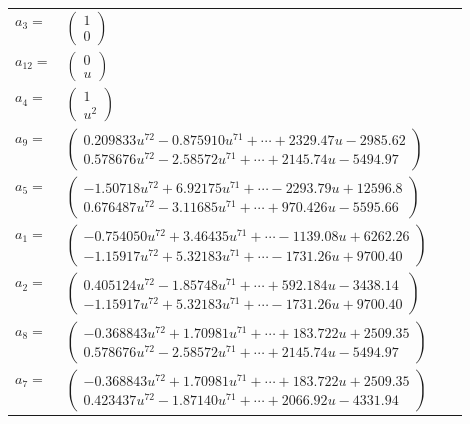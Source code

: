 \documentclass[1p]{elsarticle_modified}
\theoremstyle{definition}
\begin{document}
\begin{tabular}{m{7pt} m{180pt} m{7pt} m{180pt} }
\flushright $a_{3}=$&$\begin{pmatrix}1\\0\end{pmatrix}$ \\
\flushright $a_{12}=$&$\begin{pmatrix}0\\u\end{pmatrix}$ \\
\flushright $a_{4}=$&$\begin{pmatrix}1\\u^2\end{pmatrix}$ \\
\flushright $a_{9}=$&$\begin{pmatrix}0.209833 u^{72}-0.875910 u^{71}+\cdots+2329.47 u-2985.62\\0.578676 u^{72}-2.58572 u^{71}+\cdots+2145.74 u-5494.97\end{pmatrix}$ \\
\flushright $a_{5}=$&$\begin{pmatrix}-1.50718 u^{72}+6.92175 u^{71}+\cdots-2293.79 u+12596.8\\0.676487 u^{72}-3.11685 u^{71}+\cdots+970.426 u-5595.66\end{pmatrix}$ \\
\flushright $a_{1}=$&$\begin{pmatrix}-0.754050 u^{72}+3.46435 u^{71}+\cdots-1139.08 u+6262.26\\-1.15917 u^{72}+5.32183 u^{71}+\cdots-1731.26 u+9700.40\end{pmatrix}$ \\
\flushright $a_{2}=$&$\begin{pmatrix}0.405124 u^{72}-1.85748 u^{71}+\cdots+592.184 u-3438.14\\-1.15917 u^{72}+5.32183 u^{71}+\cdots-1731.26 u+9700.40\end{pmatrix}$ \\
\flushright $a_{8}=$&$\begin{pmatrix}-0.368843 u^{72}+1.70981 u^{71}+\cdots+183.722 u+2509.35\\0.578676 u^{72}-2.58572 u^{71}+\cdots+2145.74 u-5494.97\end{pmatrix}$ \\
\flushright $a_{7}=$&$\begin{pmatrix}-0.368843 u^{72}+1.70981 u^{71}+\cdots+183.722 u+2509.35\\0.423437 u^{72}-1.87140 u^{71}+\cdots+2066.92 u-4331.94\end{pmatrix}$ \\

\end{tabular}
\end{document}
